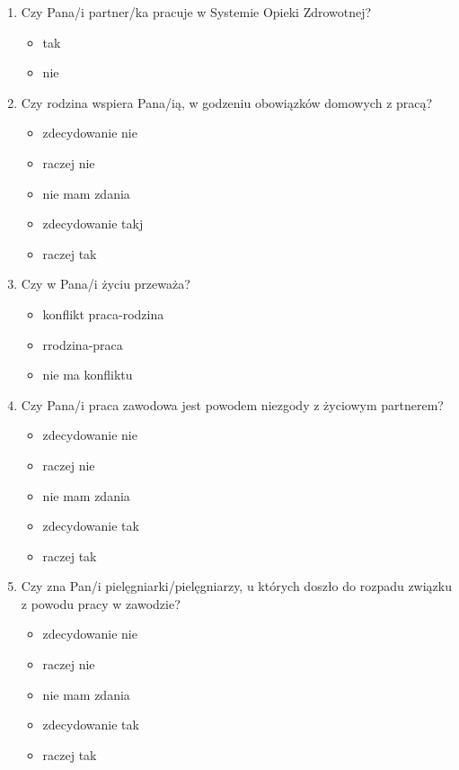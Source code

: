 \documentclass[a4paper,12pt,twoside,openright]{mwrep}
\begin{document}
\begin{appendices}
\begin{enumerate}[label=\arabic*)]
			\item{Czy Pana/i partner/ka pracuje w Systemie Opieki Zdrowotnej?}
		\begin{itemize}
		\item{tak}
		\item{nie}
		\end{itemize}
		\vspace{\baselineskip}
		
			\item{Czy rodzina wspiera Pana/ią, w godzeniu obowiązków domowych z pracą?}
		\begin{itemize}
			\item{zdecydowanie nie}
			\item{raczej nie}
			\item{nie mam zdania}
			\item{zdecydowanie takj}
			\item{raczej tak}
			\end{itemize}
		\vspace{\baselineskip}
		
			\item{ Czy w Pana/i życiu przeważa?}
		\begin{itemize}
			\item{konflikt praca-rodzina}
			\item{rrodzina-praca}
			\item{nie ma konfliktu}
			\end{itemize}
		\vspace{\baselineskip}
		
			\item{Czy Pana/i praca zawodowa jest powodem niezgody z życiowym partnerem?}
		\begin{itemize}
			\item{zdecydowanie nie}
			\item{raczej nie}
			\item{nie mam zdania}
			\item{zdecydowanie tak}
			\item{raczej tak}
		\end{itemize}
		\vspace{\baselineskip}
		
			\item{Czy zna Pan/i pielęgniarki/pielęgniarzy, u których doszło do rozpadu związku z powodu pracy w zawodzie?}
		\begin{itemize}
			\item{zdecydowanie nie}
			\item{raczej nie}
			\item{nie mam zdania}
			\item{zdecydowanie tak}
			\item{raczej tak}
		\end{itemize}
		\vspace{\baselineskip}
		

\end{enumerate}
\end{appendices}
\end{document}
